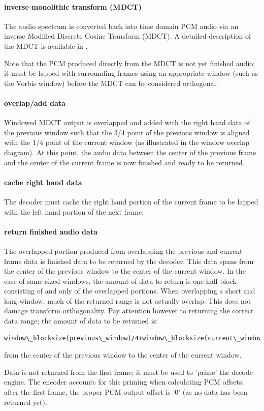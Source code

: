 \paragraph{inverse monolithic transform (MDCT)}

The audio spectrum is converted back into time domain PCM audio via an
inverse Modified Discrete Cosine Transform (MDCT).  A detailed
description of the MDCT is available in \cite{Sporer/Brandenburg/Edler}.

Note that the PCM produced directly from the MDCT is not yet finished
audio; it must be lapped with surrounding frames using an appropriate
window (such as the Vorbis window) before the MDCT can be considered
orthogonal.



\paragraph{overlap/add data}
Windowed MDCT output is overlapped and added with the right hand data
of the previous window such that the 3/4 point of the previous window
is aligned with the 1/4 point of the current window (as illustrated in
the window overlap diagram). At this point, the audio data between the
center of the previous frame and the center of the current frame is
now finished and ready to be returned.


\paragraph{cache right hand data}
The decoder must cache the right hand portion of the current frame to
be lapped with the left hand portion of the next frame.



\paragraph{return finished audio data}

The overlapped portion produced from overlapping the previous and
current frame data is finished data to be returned by the decoder.
This data spans from the center of the previous window to the center
of the current window.  In the case of same-sized windows, the amount
of data to return is one-half block consisting of and only of the
overlapped portions. When overlapping a short and long window, much of
the returned range is not actually overlap.  This does not damage
transform orthogonality.  Pay attention however to returning the
correct data range; the amount of data to be returned is:

\begin{Verbatim}[commandchars=\\\{\}]
window\_blocksize(previous\_window)/4+window\_blocksize(current\_window)/4
\end{Verbatim}

from the center of the previous window to the center of the current
window.

Data is not returned from the first frame; it must be used to 'prime'
the decode engine.  The encoder accounts for this priming when
calculating PCM offsets; after the first frame, the proper PCM output
offset is '0' (as no data has been returned yet).

